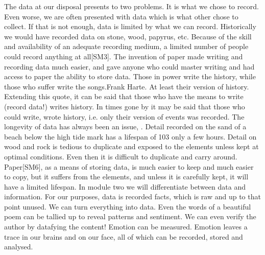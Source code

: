 The data at our disposal presents to two problems.  It is what we chose to record.  Even worse, we are often presented with data which is what other chose to collect.  If that is not enough, data is limited by what we can record.  Historically we would have recorded data on stone, wood, papyrus, etc.  Because of the skill and availability of an adequate recording medium, a limited number of people could record anything at all[SM3].  The invention of paper made writing and recording data much easier, and gave anyone who could master writing and had access to paper the ability to store data.  Those in power write the history, while those who suffer write the songs.Frank Harte.  At least their version of history.  Extending this quote, it can be said that those who have the means to write (record data!) writes history.  In times gone by it may be said that those who could write, wrote history, i.e. only their version of events was recorded. 
The longevity of data has always been an issue, \cite{Mor16}.  Detail recorded on the sand of a beach below the high tide mark has a lifespan of 
103
 only a few hours.  Detail on wood and rock is tedious to duplicate and exposed to the elements unless kept at optimal conditions.  Even then it is difficult to duplicate and carry around.  Paper[SM6], as a means of storing data, is much easier to keep and much easier to copy, but it suffers from the elements, and unless it is carefully kept, it will have a limited lifespan.  In module two we will differentiate between data and information. For our purposes, data is recorded facts, which is raw and up to that point unused.
We can turn everything into data.  Even the words of a beautiful poem can be tallied up to reveal patterns and sentiment.  We can even verify the author by datafying the content!  Emotion can be measured.  Emotion leaves a trace in our brains and on our face, all of which can be recorded, stored and analysed.

